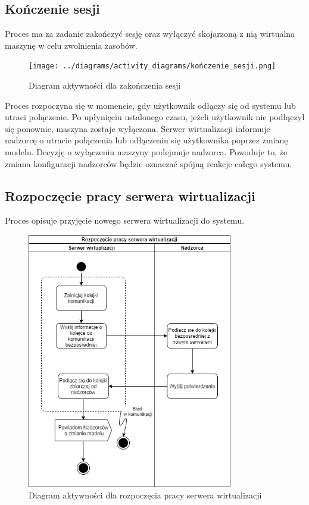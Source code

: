 \documentclass[../opis-rozwiazania.tex]{subfiles}
\begin{document}
\subsection{Kończenie sesji}

Proces ma za zadanie zakończyć sesję oraz wyłączyć skojarzoną z nią wirtualna maszynę w celu zwolnienia zasobów.

\begin{figure}[H]
  \centering
  \texttt{[image: ../diagrams/activity\_diagrams/kończenie\_sesji.png]}
  \caption{Diagram aktywności dla zakończenia sesji}
  \label{finish_session}
\end{figure}

Proces rozpoczyna się w momencie, gdy użytkownik odłączy się od systemu lub utraci połączenie. Po upłynięciu ustalonego czasu, jeżeli użytkownik nie podłączył się ponownie, maszyna zostaje wyłączona.
Serwer wirtualizacji informuje nadzorcę o utracie połączenia lub odłączeniu się użytkownika poprzez zmianę modelu.
Decyzję o wyłączeniu maszyny podejmuje nadzorca.
Powoduje to, że zmiana konfiguracji nadzorców będzie oznaczać spójną reakcje całego systemu.

\subsection{Rozpoczęcie pracy serwera wirtualizacji}

Proces opisuje przyjęcie nowego serwera wirtualizacji do systemu.

\begin{figure}[H]
  \centering
  \includegraphics[width=0.8\textwidth]{../diagrams/activity_diagrams/serwer_start.png}
  \caption{Diagram aktywności dla rozpoczęcia pracy serwera wirtualizacji}
  \label{start_virtsrv}
\end{figure}
\end{document}
